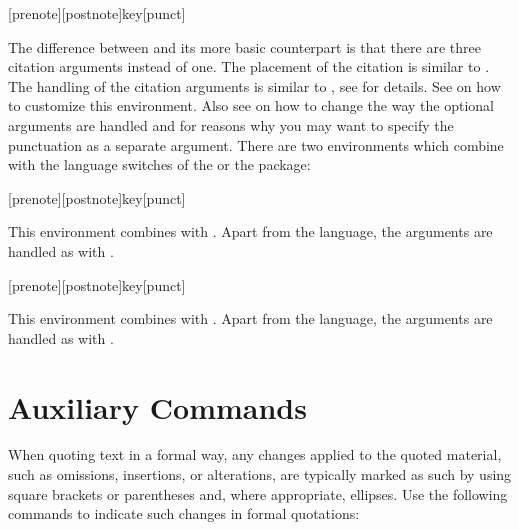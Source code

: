\documentclass{ltxdockit}[2010/09/26]
\begin{document}
\begin{ltxsyntax}

[prenote][postnote]{key}[punct]

The difference between  and its more basic counterpart is that there are three citation arguments instead of one. The placement of the citation is similar to . The handling of the citation arguments is similar to , see  for details. See  on how to customize this environment. Also see  on how to change the way the optional arguments are handled and  for reasons why you may want to specify the punctuation as a separate argument. There are two environments which combine  with the language switches of the  or the  package:

[prenote][postnote]{key}[punct]

This environment combines  with . Apart from the language, the arguments are handled as with .

[prenote][postnote]{key}[punct]

This environment combines  with . Apart from the language, the arguments are handled as with .

\end{ltxsyntax}

\section{Auxiliary Commands}
\label{aux}

When quoting text in a formal way, any changes applied to the quoted material, such as omissions, insertions, or alterations, are typically marked as such by using square brackets or parentheses and, where appropriate, ellipses. Use the following commands to indicate such changes in formal quotations:
\end{document}
